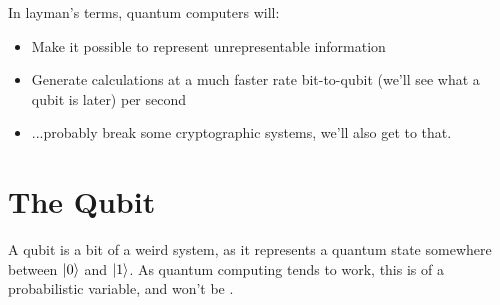 \documentclass{textbook}
\begin{document}
In layman's terms, quantum computers will:

\begin{itemize}
    \item Make it possible to represent unrepresentable information
    \item Generate calculations at a much faster rate bit-to-qubit (we'll see what a qubit is later) per second
    \item ...probably break some cryptographic systems, we'll also get to that.
\end{itemize}

\section{The Qubit}

A qubit is a bit of a weird system, as it represents a quantum state somewhere between $\lvert0\rangle$ and $\lvert1\rangle$.
As quantum computing tends to work, this is of a probabilistic variable, and won't be .
\end{document}
